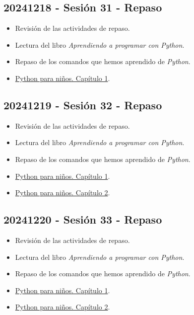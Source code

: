 \documentclass[a4paper,12pt]{article}
\begin{document}
\subsection{20241218 - Sesión 31 - Repaso}

\begin{itemize}
    \item Revisión de las actividades de repaso.
    \item Lectura del libro \textit{Aprendiendo a programar con Python}.
    \item Repaso de los comandos que hemos aprendido de \textit{Python}.
    \item \href{https://sarcior.com/Matematicas5/Python_para_niños_C01.pdf}{Python para niños. Capítulo 1}.
\end{itemize}

\subsection{20241219 - Sesión 32 - Repaso}

\begin{itemize}
    \item Revisión de las actividades de repaso.
    \item Lectura del libro \textit{Aprendiendo a programar con Python}.
    \item Repaso de los comandos que hemos aprendido de \textit{Python}.
    \item \href{https://sarcior.com/Matematicas5/Python_para_niños_C01.pdf}{Python para niños. Capítulo 1}.
    \item \href{https://sarcior.com/Matematicas5/Python_para_niños_C02.pdf}{Python para niños. Capítulo 2}.
\end{itemize}

\subsection{20241220 - Sesión 33 - Repaso}

\begin{itemize}
    \item Revisión de las actividades de repaso.
    \item Lectura del libro \textit{Aprendiendo a programar con Python}.
    \item Repaso de los comandos que hemos aprendido de \textit{Python}.
    \item \href{https://sarcior.com/Matematicas5/Python_para_niños_C01.pdf}{Python para niños. Capítulo 1}.
    \item \href{https://sarcior.com/Matematicas5/Python_para_niños_C02.pdf}{Python para niños. Capítulo 2}.
\end{itemize}
\end{document}

